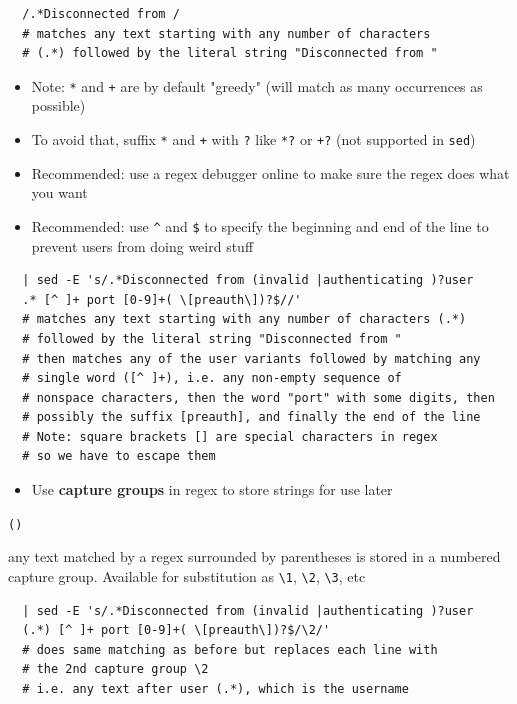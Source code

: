 \documentclass[letterpaper,12pt]{article}
\newcommand*{\lstitem}[1]{
  \setbox0\hbox{\lstinline{#1}}
  \item[\usebox0]
}
\begin{document}
\begin{lstlisting}
  /.*Disconnected from /
  # matches any text starting with any number of characters
  # (.*) followed by the literal string "Disconnected from "
\end{lstlisting}

\begin{itemize}
 \item Note: \lstinline{*} and \lstinline{+} are by default "greedy" (will match as many occurrences as possible)
 \item To avoid that, suffix \lstinline{*} and \lstinline{+}  with \lstinline{?} like \lstinline{*?} or \lstinline{+?} (not supported in \lstinline{sed})
 \item Recommended: use a regex debugger online to make sure the regex does what you want
 \item Recommended: use \lstinline{^} and \lstinline{$} to specify the beginning and end of the line to prevent users from doing weird stuff
\end{itemize}

\begin{lstlisting}
  | sed -E 's/.*Disconnected from (invalid |authenticating )?user
  .* [^ ]+ port [0-9]+( \[preauth\])?$//'
  # matches any text starting with any number of characters (.*)
  # followed by the literal string "Disconnected from "
  # then matches any of the user variants followed by matching any
  # single word ([^ ]+), i.e. any non-empty sequence of
  # nonspace characters, then the word "port" with some digits, then
  # possibly the suffix [preauth], and finally the end of the line
  # Note: square brackets [] are special characters in regex
  # so we have to escape them
\end{lstlisting}

\begin{itemize}
 \item Use \textbf{capture groups} in regex to store strings for use later
\end{itemize}

\begin{description}
 \lstitem{()} any text matched by a regex surrounded by parentheses is stored in a numbered capture group. Available for substitution as \lstinline{\1}, \lstinline{\2}, \lstinline{\3}, etc
\end{description}

\begin{lstlisting}
  | sed -E 's/.*Disconnected from (invalid |authenticating )?user
  (.*) [^ ]+ port [0-9]+( \[preauth\])?$/\2/'
  # does same matching as before but replaces each line with
  # the 2nd capture group \2
  # i.e. any text after user (.*), which is the username
\end{lstlisting}
\end{document}
